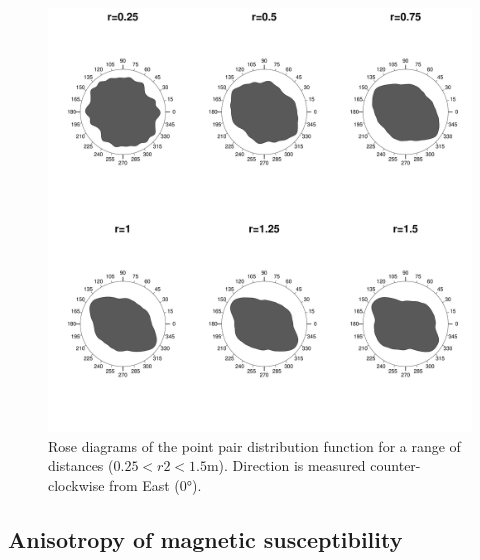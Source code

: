 \documentclass[review,times,authoryear]{elsarticle} %
\begin{document}
\begin{figure}
  \centering
  \includegraphics[width=1\textwidth]{./artwork/Fig:ppp_.pdf}
  \caption{Rose diagrams of the point pair distribution function for a range of distances ($0.25<r2<1.5$m). Direction is measured counter-clockwise from East (0°).}
  \label{fig:ppp}
\end{figure}

\subsection{Anisotropy of magnetic susceptibility}
\end{document}
